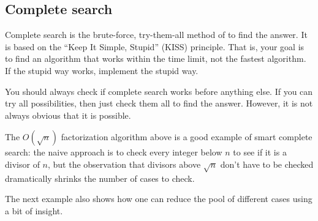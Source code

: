 \subsection{Complete search}

Complete search is the brute-force, try-them-all method of to find the answer.
It is based on the ``Keep It Simple, Stupid'' (KISS) principle.
That is, your goal is to find an algorithm that works within the time limit,
not the fastest algorithm.
If the stupid way works, implement the stupid way.

You should always check if complete search works before anything else.
If you can try all possibilities, then just check them all to find the answer.
However, it is not always obvious that it is possible.

The $O(\sqrt{n})$ factorization algorithm above is a good example of
smart complete search:
the naive approach is to check every integer below $n$ to see if it is a divisor
of $n$, but the observation that divisors above $\sqrt{n}$
don't have to be checked dramatically shrinks the number of cases to check.

The next example also shows how one can reduce the pool of different cases
using a bit of insight.


